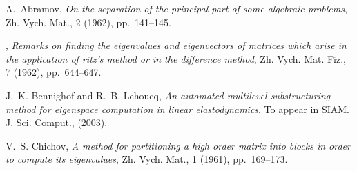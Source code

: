 \documentclass{report}
\begin{document}

\begin{thebibliography}{10}

{\sc A.~Abramov}, {\em On the separation of the principal part of some
algebraic problems}, Zh. Vych. Mat., 2 (1962), pp.~141--145.

\leavevmode\vrule height 2pt depth -1.6pt width 23pt, {\em Remarks on
finding the eigenvalues and eigenvectors of matrices which arise in the
application of ritz's method or in the difference method}, Zh. Vych. Mat.
Fiz., 7 (1962), pp.~644--647.

{\sc J.~K. Bennighof and R.~B. Lehoucq}, {\em An automated multilevel
substructuring method for eigenspace computation in linear
elastodynamics}. To appear in SIAM. J. Sci. Comput., (2003).

 {\sc V.~S. Chichov}, {\em A method for partitioning a
high order matrix into blocks in order to compute its eigenvalues}, Zh.
Vych. Mat., 1 (1961), pp.~169--173.

\end{thebibliography}
\end{document}
